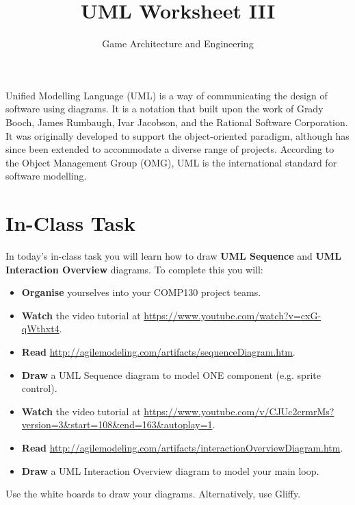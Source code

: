 \documentclass{scrartcl}
\begin{document}
\title{UML Worksheet III}
\author{Game Architecture and Engineering}
\date{}

\maketitle

Unified Modelling Language (UML) is a way of communicating the design of software using diagrams. It is a notation that built upon the work of Grady Booch, James Rumbaugh, Ivar Jacobson, and the Rational Software Corporation. It was originally developed to support the object-oriented paradigm, although has since been extended to accommodate a diverse range of projects. According to the Object Management Group (OMG), UML is the international standard for software modelling.

\section{In-Class Task}

In today's in-class task you will learn how to draw \textbf{UML Sequence} and \textbf{UML Interaction Overview} diagrams. To complete this you will:

\begin{itemize}
	\item \textbf{Organise} yourselves into your COMP130 project teams.
	\item \textbf{Watch} the video tutorial at \url{https://www.youtube.com/watch?v=cxG-qWthxt4}.
	\item \textbf{Read} \url{http://agilemodeling.com/artifacts/sequenceDiagram.htm}.
	\item \textbf{Draw} a UML Sequence diagram to model ONE component (e.g. sprite control).
	\item \textbf{Watch} the video tutorial at \url{https://www.youtube.com/v/CJUc2crmrMs?version=3\&start=108\&end=163\&autoplay=1}.
	\item \textbf{Read} \url{http://agilemodeling.com/artifacts/interactionOverviewDiagram.htm}.
	\item \textbf{Draw} a UML Interaction Overview diagram to model your main loop.
\end{itemize}

\vspace{0.5ex}

Use the white boards to draw your diagrams. Alternatively, use Gliffy.
\end{document}
